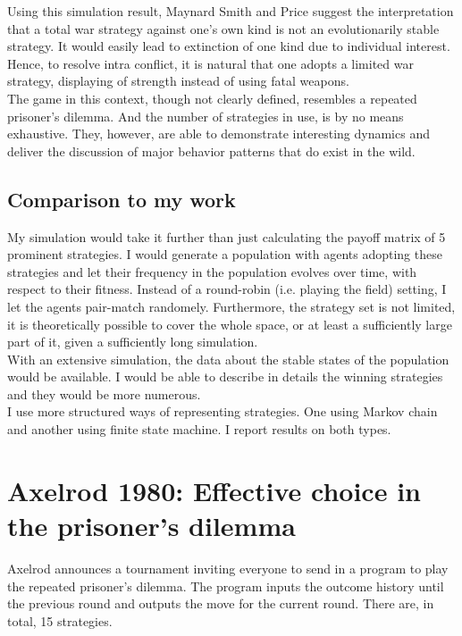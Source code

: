 \documentclass[12.5pt]{report}
\begin{document}
Using this simulation result, Maynard Smith and Price suggest the interpretation that a total war strategy against one’s own kind is not an evolutionarily stable strategy. It would easily lead to extinction of one kind due to individual interest. Hence, to resolve intra conflict, it is natural that one adopts a limited war strategy, displaying of strength instead of using fatal weapons.\\

The game in this context, though not clearly defined, resembles a repeated prisoner’s dilemma. And the number of strategies in use, is by no means exhaustive. They, however, are able to demonstrate interesting dynamics and deliver the discussion of major behavior patterns that do exist in the wild.\\

\subsection{Comparison to my work}
My simulation would take it further than just calculating the payoff matrix of 5 prominent strategies. I would generate a population with agents adopting these strategies and let their frequency in the population evolves over time, with respect to their fitness. Instead of a round-robin (i.e. playing the field) setting, I let the agents pair-match randomely. Furthermore, the strategy set is not limited, it is theoretically possible to cover the whole space, or at least a sufficiently large part of it, given a sufficiently long simulation.\\

With an extensive simulation, the data about the stable states of the population would be available. I would be able to describe in details the winning strategies and they would be more numerous.\\

I use more structured ways of representing strategies. One using Markov chain and another using finite state machine. I report results on both types.

\section{Axelrod 1980: Effective choice in the prisoner’s dilemma}
Axelrod announces a tournament inviting everyone to send in a program to play the repeated prisoner’s dilemma. The program inputs the outcome history until the previous round and outputs the move for the current round. There are, in total, 15 strategies. \\
\end{document}

